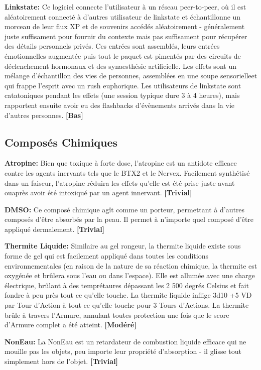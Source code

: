 \textbf{Linkstate:} Ce logiciel connecte l'utilisateur à un réseau peer-to-peer, où il est aléatoirement connecté à d'autres utilisateur de linkstate et échantillonne un morceau de leur flux XP et de souvenirs accédés aléatoirement - généralement juste suffisament pour fournir du contexte mais pas suffisament pour récupérer des détails personnels privés. Ces entrées sont assemblés, leurs entrées émotionnelles augmentée puis tout le paquet est pimentés par des circuits de déclenchement hormonaux et des synaesthésie artificielle. Les effets sont un mélange d'échantillon des vies de personnes, assemblées en une soupe sensorielleet qui frappe l'esprit avec un rush euphorique. Les utilisateurs de linkstate sont catatoniques pendant les effets (une session typique dure 3 à 4 heures), mais rapportent ensuite avoir eu des flashbacks d'évènements arrivés dans la vie d'autres personnes. \textbf{[Bas]} 

\subsection{Composés Chimiques} \label{sec:chemicals} 

\textbf{Atropine:} Bien que toxique à forte dose, l'atropine est un antidote efficace contre les agents inervants tels que le BTX2 et le Nervex. Facilement synthétisé dans un faiseur, l'atropine réduira les effets qu'elle est été prise juste avant ouaprès avoir été intoxiqué par un agent innervant. \textbf{[Trivial]} 

\textbf{DMSO:} Ce composé chimique agît comme un porteur, permettant à d'autres composés d'être absorbés par la peau. Il permet à n'importe quel composé d'être appliqué dermalement. \textbf{[Trivial]} 

\textbf{Thermite Liquide:} Similaire au gel rongeur, la thermite liquide existe sous forme de gel qui est facilement appliqué dans toutes les conditions environnementales (en raison de la nature de sa réaction chimique, la thermite est oxygénée et brûlera sous l'eau ou dans l'espace). Elle est allumée avec une charge électrique, brûlant à des temprétaures dépassant les 2 500 degrés Celsius et fait fondre à peu près tout ce qu'elle touche. La thermite liquide inflige 3d10 +5 VD par Tour d'Action à tout ce qu'elle touche pour 3 Tours d'Actions. La thermite brûle à travers l'Armure, annulant toutes protection une fois que le score d'Armure complet a été atteint. \textbf{[Modéré]} 

\textbf{NonEau:} La NonEau est un retardateur de combustion liquide efficace qui ne mouille pas les objets, peu importe leur propriété d'absorption - il glisse tout simplement hors de l'objet. \textbf{[Trivial]} 

